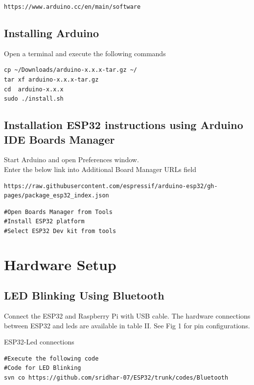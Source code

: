 \documentclass[journal,12pt,twocolumn]{IEEEtran}
\begin{document}
\begin{lstlisting}
https://www.arduino.cc/en/main/software
\end{lstlisting}
\subsection{ Installing Arduino}
Open a terminal and execute the following commands
\begin{lstlisting}
cp ~/Downloads/arduino-x.x.x-tar.gz ~/
tar xf arduino-x.x.x-tar.gz
cd  arduino-x.x.x
sudo ./install.sh
\end{lstlisting}

\subsection{Installation ESP32 instructions using Arduino IDE Boards Manager}
Start Arduino and open Preferences window.\\
Enter the below link into Additional Board Manager URLs field
\begin{lstlisting}
https://raw.githubusercontent.com/espressif/arduino-esp32/gh-pages/package_esp32_index.json
\end{lstlisting}
\begin{lstlisting}
#Open Boards Manager from Tools
#Install ESP32 platform
#Select ESP32 Dev kit from tools
\end{lstlisting}

\section{Hardware Setup}
\subsection{LED Blinking Using Bluetooth}
Connect the ESP32 and Raspberry Pi with USB cable. The hardware connections between ESP32 and leds are available in table II. See Fig 1 for pin configurations. 
\begin{table}[!h]
\centering

\caption{ESP32-Led connections}
\label{table:pins}
\end{table}
\begin{lstlisting}
#Execute the following code
#Code for LED Blinking
svn co https://github.com/sridhar-07/ESP32/trunk/codes/Bluetooth
\end{lstlisting}
\end{document}
